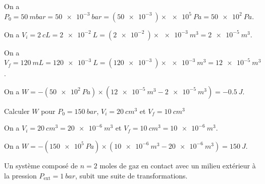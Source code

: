 
\begin{corrige}
	On a $P_0=\SI{50}{mbar}=\SI{50e-3}{bar}=\left(\SI{50e-3}{}\right)\times \SI{e5}{Pa}=\SI{50e2}{Pa}$.
	
	On a $V_i=\SI{2}{cL}=\SI{2e-2}{L}=\left(\SI{2e-2}{}\right)\times\SI{e-3}{m^3}=\SI{2e-5}{m^3}$.
	
	On a $V_f=\SI{120}{mL}=\SI{120e-3}{L}=\left(\SI{120e-3}{}\right)\times\SI{e-3}{m^3}=\SI{12e-5}{m^3}$.
	
	On a $W=-\left(\SI{50e2}{Pa}\right)\times\left(\SI{12e-5}{m^3} - \SI{2e-5}{m^3}\right)=\SI{-0,5}{J}$.
\end{corrige}

\begin{enonce}
	Calculer $W$ pour $P_0=\SI{150}{bar}$, $V_i=\SI{20}{cm^3}$ et $V_f=\SI{10}{cm^3}$
\end{enonce}


\begin{corrige}
	On a $V_i=\SI{20}{cm^3}=\SI{20e-6}{m^3}$ et $V_f=\SI{10}{cm^3}=\SI{10e-6}{m^3}$.
	
	On a $W=-\left(\SI{150e5}{Pa}\right)\times\left(\SI{10e-6}{m^3} - \SI{20e-6}{m^3}\right)=\SI{150}{J}$.
\end{corrige}
\finEntrainement








\hauteurLargeurCadreReponse		{8mm}{5cm}
\initialisationEntrainement

Un système composé de $n=2$ moles de gaz en contact avec un milieu extérieur à la pression $P_{\text{ext}}=\SI{1}{bar}$, subit une suite de transformations. 

